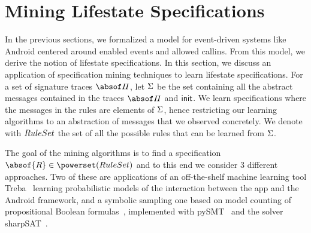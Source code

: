 \documentclass[10pt,reprint,nocopyrightspace,numbers]{sigplanconf}
\begin{document}


\section{Mining Lifestate Specifications}\label{sec:mining}
%
In the previous sections, we formalized a model for event-driven systems like Android centered around enabled events and allowed callins. From this model, we derive the notion of lifestate specifications. In this section, we discuss an application of specification mining techniques to learn lifestate specifications.
%
For a set of signature traces $\abstraceset$,
let $\Sigma$ be the set containing all the abstract messages
contained in the traces $\abstraceset$ and $\mathsf{init}$.
%
We learn specifications where the messages in the rules
are elements of $\Sigma$, hence restricting our learning
algorithms to an abstraction of messages that we observed concretely.
We denote with $RuleSet$ the set of all the possible rules
that can be learned from $\Sigma$.

The goal of the mining algorithms is to find a specification
$\absof{\directiveset} \in \powerset(\RuleSet)$ and to this end we consider 
3 different approaches. Two of these are applications of an off-the-shelf 
machine learning tool Treba~\cite{hulden2012treba} learning probabilistic models of 
the interaction between the app and the Android framework, and a 
symbolic sampling one based on model counting of propositional Boolean
formulas~\cite{sharpsat}, implemented with pySMT~\cite{pysmt} and the solver sharpSAT~\cite{sharpsattool}.

\end{document}
